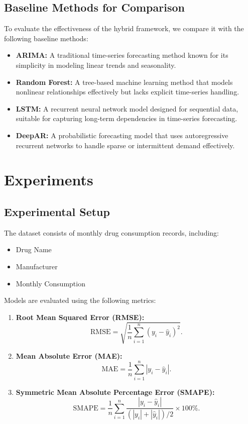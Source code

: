 \documentclass[conference]{IEEEtran}
\begin{document}
\subsection{Baseline Methods for Comparison}
To evaluate the effectiveness of the hybrid framework, we compare it with the following baseline methods:
\begin{itemize}
    \item \textbf{ARIMA:} A traditional time-series forecasting method known for its simplicity in modeling linear trends and seasonality.
    \item \textbf{Random Forest:} A tree-based machine learning method that models nonlinear relationships effectively but lacks explicit time-series handling.
    \item \textbf{LSTM:} A recurrent neural network model designed for sequential data, suitable for capturing long-term dependencies in time-series forecasting.
    \item \textbf{DeepAR:} A probabilistic forecasting model that uses autoregressive recurrent networks to handle sparse or intermittent demand effectively.
\end{itemize}

\section{Experiments}

\subsection{Experimental Setup}
The dataset consists of monthly drug consumption records, including:
\begin{itemize}
    \item Drug Name
    \item Manufacturer
    \item Monthly Consumption
\end{itemize}

Models are evaluated using the following metrics:
\begin{enumerate}
    \item \textbf{Root Mean Squared Error (RMSE):}
    \begin{equation}
    \text{RMSE} = \sqrt{\frac{1}{n} \sum_{i=1}^n \left( y_i - \hat{y}_i \right)^2}.
    \end{equation}

    \item \textbf{Mean Absolute Error (MAE):}
    \begin{equation}
    \text{MAE} = \frac{1}{n} \sum_{i=1}^n \left| y_i - \hat{y}_i \right|.
    \end{equation}

    \item \textbf{Symmetric Mean Absolute Percentage Error (SMAPE):}
    \begin{equation}
    \text{SMAPE} = \frac{1}{n} \sum_{i=1}^n \frac{\left| y_i - \hat{y}_i \right|}{\left( |y_i| + |\hat{y}_i| \right) / 2} \times 100\%.
    \end{equation}
\end{enumerate}
\end{document}
